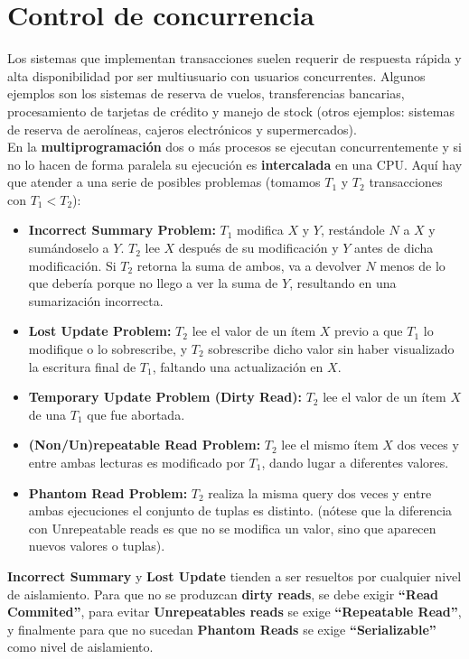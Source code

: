 \section*{Control de concurrencia}
Los sistemas que implementan transacciones suelen requerir de respuesta rápida y alta disponibilidad por ser multiusuario con usuarios concurrentes. Algunos ejemplos son los sistemas de reserva de vuelos, transferencias bancarias, procesamiento de tarjetas de crédito y manejo de stock (otros ejemplos: sistemas de reserva de aerolíneas, cajeros electrónicos y supermercados). \\
En la \textbf{multiprogramación} dos o más procesos se ejecutan concurrentemente y si no lo hacen de forma paralela su ejecución es \textbf{intercalada} en una CPU. Aquí hay que atender a una serie de posibles problemas (tomamos $T_1$ y $T_2$ transacciones con $T_1 < T_2$):
\begin{itemize}
    \item \textbf{Incorrect Summary Problem:} $T_1$ modifica $X$ y $Y$, restándole $N$ a $X$ y sumándoselo a $Y$. $T_2$ lee $X$ después de su modificación y $Y$ antes de dicha modificación. Si $T_2$ retorna la suma de ambos, va a devolver $N$ menos de lo que debería porque no llego a ver la suma de $Y$, resultando en una sumarización incorrecta.
    \item \textbf{Lost Update Problem:} $T_2$ lee el valor de un ítem $X$ previo a que $T_1$ lo modifique o lo sobrescribe, y $T_2$ sobrescribe dicho valor sin haber visualizado la escritura final de $T_1$, faltando una actualización en $X$.
    \item \textbf{Temporary Update Problem (Dirty Read):} $T_2$ lee el valor de un ítem $X$ de una $T_1$ que fue abortada.
    \item \textbf{(Non/Un)repeatable Read Problem:} $T_2$ lee el mismo ítem $X$ dos veces y entre ambas lecturas es modificado por $T_1$, dando lugar a diferentes valores.
    \item \textbf{Phantom Read Problem:} $T_2$ realiza la misma query dos veces y entre ambas ejecuciones el conjunto de tuplas es distinto. (nótese que la diferencia con Unrepeatable reads es que no se modifica un valor, sino que aparecen nuevos valores o tuplas).
\end{itemize}

\textbf{Incorrect Summary} y \textbf{Lost Update} tienden a ser resueltos por cualquier nivel de aislamiento. Para que no se produzcan \textbf{dirty reads}, se debe exigir \textbf{``Read Commited''}, para evitar \textbf{Unrepeatables reads} se exige \textbf{``Repeatable Read''}, y finalmente para que no sucedan \textbf{Phantom Reads} se exige \textbf{``Serializable''} como nivel de aislamiento.

